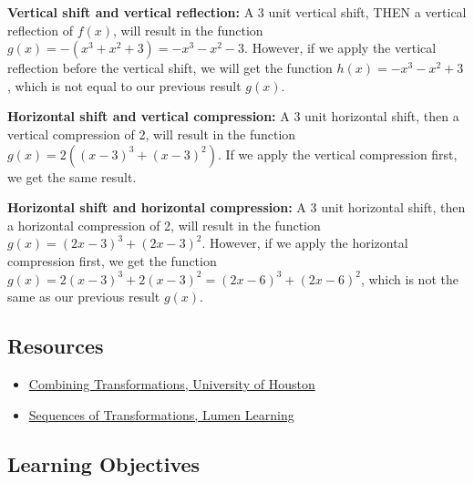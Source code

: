 \textbf{Vertical shift and vertical reflection:} A 3 unit vertical shift, THEN a vertical reflection of $f(x)$, will result in the function $g(x) = -(x^3 + x^2 + 3) = -x^3 - x^2 - 3$. However, if we apply the vertical reflection before the vertical shift, we will get the function $h(x) = -x^3 - x^2 + 3$, which is not equal to our previous result $g(x)$.

\textbf{Horizontal shift and vertical compression:} A 3 unit horizontal shift, then a vertical compression of 2, will result in the function $g(x) = 2((x - 3)^3 + (x - 3)^2)$. If we apply the vertical compression first, we get the same result.

\textbf{Horizontal shift and horizontal compression:} A 3 unit horizontal shift, then a horizontal compression of 2, will result in the function $g(x) = (2x - 3)^3 + (2x - 3)^2$. However, if we apply the horizontal compression first, we get the function $g(x) = 2(x - 3)^3 + 2(x - 3)^2 = (2x - 6)^3 + (2x - 6)^2$, which is not the same as our previous result $g(x)$.

\subsection{Resources}
\label{sss:reso-55b5}

\begin{itemize}
    \item \href{https://online.math.uh.edu/Math1330-unpaid/ch1/s13/CombTransf/Combining_Transformations_Math1330_s13.pdf}{Combining Transformations, University of Houston}
    \item \href{https://courses.lumenlearning.com/waymakercollegealgebra/chapter/sequences-of-transformations/}{Sequences of Transformations, Lumen Learning}
\end{itemize}

\subsection{Learning Objectives}
\label{ssec:lear-74d6}

